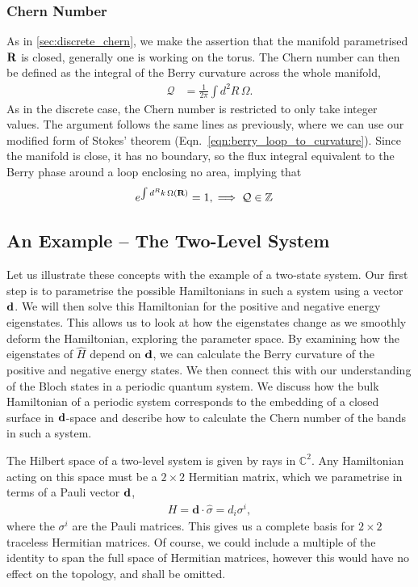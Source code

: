\subsubsection{Chern Number}

As in \textsection\ref{sec:discrete_chern}, we make the assertion that the manifold parametrised $\textbf R$ is closed, generally one is working on the torus. The Chern number can then be defined as the integral of the Berry curvature across the whole manifold,
\begin{align} \label{eqn:cont_chern_number}
    \mathcal Q &= \frac{1}{2\pi} \int d^2 R \, \Omega.
\end{align}
As in the discrete case, the Chern number is restricted to only take integer values. The argument follows the same lines as previously, where we can use our modified form of Stokes' theorem (Eqn.~\ref{eqn:berry_loop_to_curvature}). Since the manifold is close, it has no boundary, so the flux integral equivalent to the Berry phase around a loop enclosing no area, implying that
\begin{align}
    e^{\int d^R k\,  \Omega (\textbf R)} &= 1,
    \implies \mathcal Q \in \mathbb Z
\end{align}

\subsection{An Example -- The Two-Level System} \label{sec:an_example}

Let us illustrate these concepts with the example of a two-state system. Our first step is to parametrise the possible Hamiltonians in such a system using a vector $\textbf d$. We will then solve this Hamiltonian for the positive and negative energy eigenstates. This allows us to look at how the eigenstates change as we smoothly deform the Hamiltonian, exploring the parameter space. By examining how the eigenstates of $\hat H$ depend on $\textbf d$, we can calculate the Berry curvature of the positive and negative energy states. We then connect this with our understanding of the Bloch states in a periodic quantum system. We discuss how the bulk Hamiltonian of a periodic system corresponds to the embedding of a closed surface in $\textbf d$-space and describe how to calculate the Chern number of the bands in such a system.

The Hilbert space of a two-level system is given by rays in $\mathbb C ^2$. Any Hamiltonian acting on this space must be a $2\times 2$ Hermitian matrix, which we parametrise in terms of a Pauli vector $\textbf d$,
\begin{align}
    H = \textbf{d}\cdot\hat{\sigma}  = d_i \sigma^i,
\end{align}
where the $\sigma^i$ are the Pauli matrices. This gives us a complete basis for $2\times2$ traceless Hermitian matrices. Of course, we could include a multiple of the identity to span the full space of Hermitian matrices, however this would have no effect on the topology, and shall be omitted.


